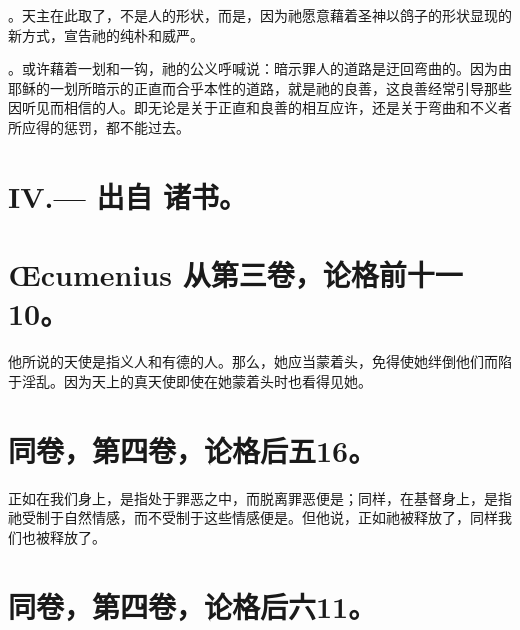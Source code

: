 。天主在此取了，不是人的形状，而是，因为祂愿意藉着圣神以鸽子的形状显现的新方式，宣告祂的纯朴和威严。\par

。或许藉着一划和一钩，祂的公义呼喊说：暗示罪人的道路是迂回弯曲的。因为由耶稣的一划所暗示的正直而合乎本性的道路，就是祂的良善，这良善经常引导那些因听见而相信的人。即无论是关于正直和良善的相互应许，还是关于弯曲和不义者所应得的惩罚，都不能过去。\par


\section{IV.— 出自  诸书。}


\section{Œcumenius 从第三卷，论格前十一10。}

他所说的天使是指义人和有德的人。那么，她应当蒙着头，免得使她绊倒他们而陷于淫乱。因为天上的真天使即使在她蒙着头时也看得见她。\par


\section{同卷，第四卷，论格后五16。}

正如在我们身上，是指处于罪恶之中，而脱离罪恶便是；同样，在基督身上，是指祂受制于自然情感，而不受制于这些情感便是。但他说，正如祂被释放了，同样我们也被释放了。\par


\section{同卷，第四卷，论格后六11。}

